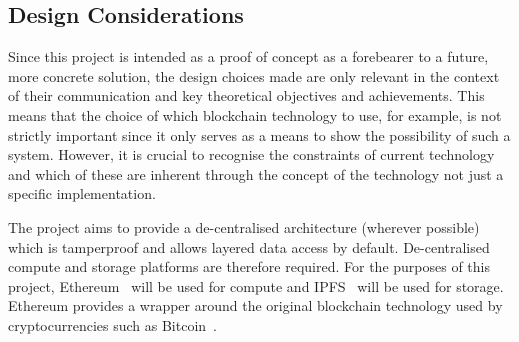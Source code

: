 \subsection{Design Considerations}

Since this project is intended as a proof of concept as a forebearer to a future, more concrete solution, the design choices made are only relevant in the context of their communication and key theoretical objectives and achievements. This means that the choice of which blockchain technology to use, for example, is not strictly important since it only serves as a means to show the possibility of such a system. However, it is crucial to recognise the constraints of current technology and which of these are inherent through the concept of the technology not just a specific implementation.

The project aims to provide a de-centralised architecture (wherever possible) which is tamperproof and allows layered data access by default. De-centralised compute and storage platforms are therefore required. For the purposes of this project, Ethereum~\autocite{ethereum:2014:online} will be used for compute and IPFS~\autocite{ipfs:2017:online} will be used for storage. Ethereum provides a wrapper around the original blockchain technology used by cryptocurrencies such as Bitcoin~\autocite{bitcoin:2013:online}.
